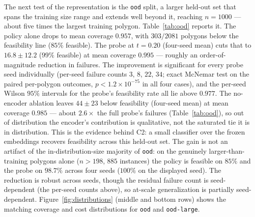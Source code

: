 \documentclass[preprint,10pt]{elsarticle}
\begin{document}
The next test of the representation is the \texttt{ood} split, a larger held-out set that spans the training size range and extends well beyond it, reaching $n = 1000$ --- about five times the largest training polygon. Table~\ref{tab:ood} reports it. The policy alone drops to mean coverage $0.957$, with $303/2081$ polygons below the feasibility line ($85\%$ feasible). The probe at $t = 0.20$ (four-seed mean) cuts that to $16.8 \pm 12.2$ ($99\%$ feasible) at mean coverage $0.995$ --- roughly an order-of-magnitude reduction in failures. The improvement is significant for every probe seed individually (per-seed failure counts $3$, $8$, $22$, $34$; exact McNemar test on the paired per-polygon outcomes, $p < 1.2 \times 10^{-75}$ in all four cases), and the per-seed Wilson $95\%$ intervals for the probe's feasibility rate all lie above $0.977$. The no-encoder ablation leaves $44 \pm 23$ below feasibility (four-seed mean) at mean coverage $0.985$ --- about $2.6\times$ the full probe's failures (Table~\ref{tab:ood}), so out of distribution the encoder's contribution is qualitative, not the saturated tie it is in distribution. This is the evidence behind C2: a small classifier over the frozen embeddings recovers feasibility across this held-out set. The gain is not an artifact of the in-distribution-size majority of \texttt{ood}: on the genuinely larger-than-training polygons alone ($n > 198$, $885$ instances) the policy is feasible on $85\%$ and the probe on $98.7\%$ across four seeds ($100\%$ on the displayed seed). The reduction is robust across seeds, though the residual failure count is seed-dependent (the per-seed counts above), so at-scale generalization is partially seed-dependent. Figure~\ref{fig:distributions} (middle and bottom rows) shows the matching coverage and cost distributions for \texttt{ood} and \texttt{ood-large}.

\begin{table}[t]
  \centering
  \small
  \resizebox{\textwidth}{!}{}
  \caption{Extreme out-of-distribution evaluation on the \texttt{ood-large} split ($285$ polygons, $n$ from $600$ to $2250$), coverage scored by exact CGAL at $t = 0.20$. The approximation ratio is omitted because the ILP optimum is unavailable for $79$ of these polygons (all with $n \geq 800$; Section~\ref{sec:exp-eval}); the reported columns are over all $285$. Both the full-probe and no-encoder rows are the four-seed mean $\pm$ std, and their $\min \mathrm{Cov}$ is the mean $\pm$ std of the four per-seed worst-polygon coverages.}
  \label{tab:large}
\end{table}
\end{document}
